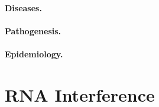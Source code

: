 \paragraph{Diseases.}
\paragraph{Pathogenesis.}
\paragraph{Epidemiology.}

\section{RNA Interference}
